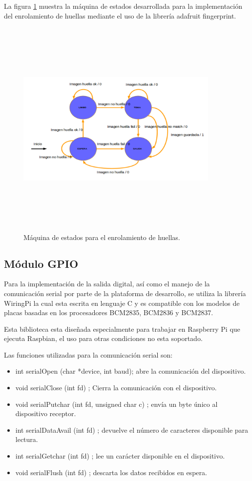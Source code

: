 La figura \ref{fig:maquinaenrolar} muestra la máquina de estados desarrollada para la implementación del enrolamiento de huellas mediante el uso de la librería adafruit fingerprint.

\begin{figure}[H]
	\centering
	\includegraphics[height=11cm,width=10cm]{./Figures/maquinaenrolar.png}
	\caption{Máquina de estados para el enrolamiento de huellas.}
	\label{fig:maquinaenrolar}
\end{figure}
\subsection{Módulo GPIO}
Para la implementación de la salida digital, así como el manejo de la comunicación serial por parte de la plataforma de desarrollo, se utiliza la librería WiringPi la cual esta escrita en lenguaje C y es compatible con los modelos de placas basadas en los procesadores  BCM2835, BCM2836 y BCM2837.

Esta biblioteca esta diseñada especialmente para trabajar en Raspberry Pi que ejecuta Raspbian, el uso para otras condiciones no esta soportado.

Las funciones utilizadas para la comunicación serial son:

\begin{itemize}
\item int serialOpen (char *device, int baud); abre la comunicación del dispositivo. 
\item void serialClose (int fd) ; Cierra la comunicación con el dispositivo. 
\item void serialPutchar (int fd, unsigned char c) ; envía un byte único al dispositivo receptor.
\item int serialDataAvail (int fd) ; devuelve el número de caracteres disponible para lectura. 
\item int serialGetchar (int fd) ; lee un carácter disponible en el dispositivo. 
\item void serialFlush (int fd) ; descarta los datos recibidos en espera.
\end{itemize}

